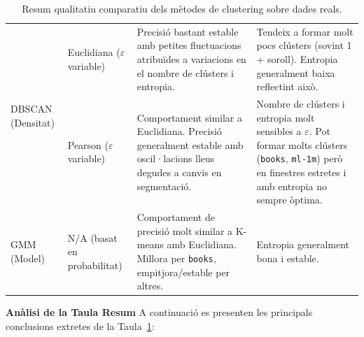 \documentclass[a4paper,12pt]{report}
\begin{document}
\begin{table}[H]
\begin{tabular}{|p{2.5cm}|p{3cm}|p{4.5cm}|p{4.5cm}|}
    \multirow{2}{=}{DBSCAN (Densitat)} & Euclidiana (\(\varepsilon\) variable) & Precisió bastant estable amb petites fluctuacions atribuïdes a variacions en el nombre de clústers i entropia. & Tendeix a formar molt pocs clústers (sovint 1 + soroll). Entropia generalment baixa reflectint això. \\ \cline{2-4}
     & Pearson (\(\varepsilon\) variable) & Comportament similar a Euclidiana. Precisió generalment estable amb oscil·lacions lleus degudes a canvis en segmentació. & Nombre de clústers i entropia molt sensibles a \(\varepsilon\). Pot formar molts clústers (\texttt{books}, \texttt{ml-1m}) però en finestres estretes i amb entropia no sempre òptima. \\ \hline
     
    GMM (Model) & N/A (basat en probabilitat) & Comportament de precisió molt similar a K-means amb Euclidiana. Millora per \texttt{books}, empitjora/estable per altres. & Entropia generalment bona i estable. \\ \hline
    
    \end{tabular}
    \caption{Resum qualitatiu comparatiu dels mètodes de clustering sobre dades reals.}
    \label{tab:resum-clustering-global}
\end{table}

\textbf{Anàlisi de la Taula Resum}
A continuació es presenten les principals conclusions extretes de la Taula~\ref{tab:resum-clustering-global}:
\end{document}
